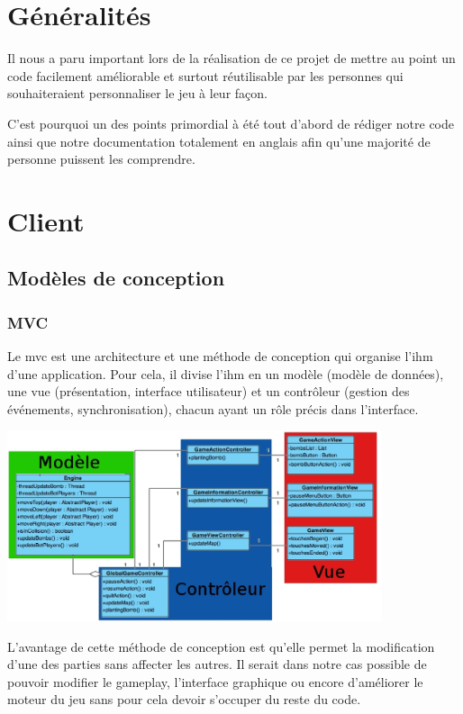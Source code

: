 \section{Généralités}

	Il nous a paru important lors de la réalisation de ce projet
	de mettre au point un code facilement améliorable et surtout
	réutilisable par les personnes qui souhaiteraient personnaliser
	le jeu à leur façon.
	
	C'est pourquoi un des points primordial à été tout d'abord de
	rédiger notre code ainsi que notre documentation totalement 
	en anglais afin qu'une majorité de personne puissent les comprendre.

\section{Client}

	\subsection{Modèles de conception}
	
		\subsubsection{MVC}
		
			Le \gls{mvc} est une architecture et une méthode de
			conception qui organise l'\gls{ihm} d'une 
			application.
			Pour cela, il divise l'\gls{ihm} en un modèle (modèle de données),
			une vue (présentation, interface utilisateur) et un contrôleur
			(gestion des événements, synchronisation), chacun ayant un rôle
			précis dans l'interface.
			
			\begin{center}
				\includegraphics[width=11cm]{./Reutilisabilite/Img/mvc.eps}
			\end{center} 
			
			L'avantage de cette méthode de conception est qu'elle permet la
			modification d'une des parties sans affecter les autres.
			Il serait dans notre cas possible de pouvoir modifier le gameplay,
			l'interface graphique ou encore d'améliorer le moteur du jeu sans pour
			cela devoir s'occuper du reste du code.		
		
